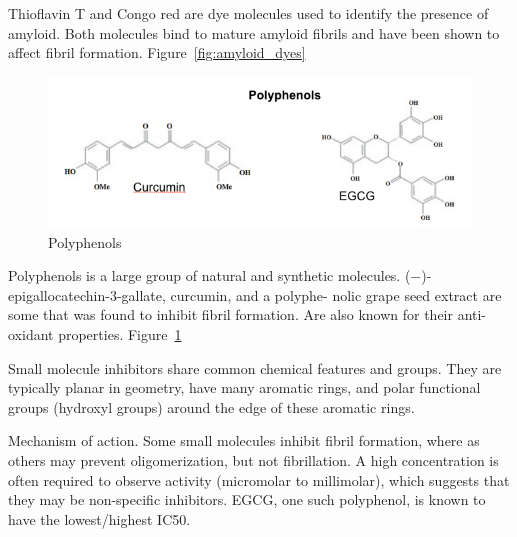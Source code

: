 \begin{outline}[enumerate]
        \3 Thioflavin T and Congo red are dye molecules used to identify the presence of amyloid.  Both molecules bind to mature amyloid fibrils and have been shown to affect fibril formation. Figure~\ref{fig:amyloid_dyes}

        \begin{figure}
          \centering
          \includegraphics[width=6in]{figures/introduction/polyphenols.png}
          \caption[Small molecule binders]{Polyphenols}
          \label{fig:polyphenols}
        \end{figure}
        
        \3 Polyphenols is a large group of natural and synthetic molecules.  (−)-epigallocatechin-3-gallate, curcumin, and a polyphe- nolic grape seed extract are some that was found to inhibit fibril formation. Are also known for their anti-oxidant properties. Figure~\ref{fig:polyphenols}
      
      \2 Small molecule inhibitors share common chemical features and groups.  They are typically planar in geometry, have many aromatic rings, and polar functional groups (hydroxyl groups) around the edge of these aromatic rings.
    
    	\2 Mechanism of action. Some small molecules inhibit fibril formation, where as others may prevent oligomerization, but not fibrillation. A high concentration is often required to observe activity (micromolar to millimolar), which suggests that they may be non-specific inhibitors. EGCG, one such polyphenol, is known to have the lowest/highest IC50.
      

\end{outline}

